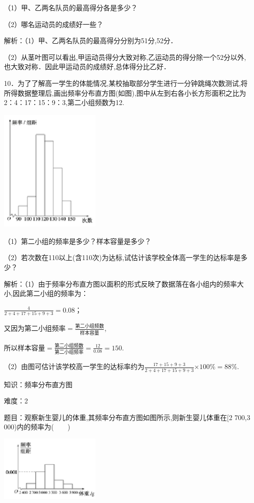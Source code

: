 \documentclass{article} %
\begin{document}
（1）甲、乙两名队员的最高得分各是多少？

（2）哪名运动员的成绩好一些？

解析：（1）甲、乙两名队员的最高得分分别为51分,52分．

（2）从茎叶图可以看出,甲运动员得分大致对称,乙运动员的得分除一个52分以外,也大致对称．因此甲运动员的成绩好,总体得分比乙好．

10．为了了解高一学生的体能情况,某校抽取部分学生进行一分钟跳绳次数测试,将所得数据整理后,画出频率分布直方图(如图),图中从左到右各小长方形面积之比为2：4：17：15：9：3,第二小组频数为12.

\includegraphics*[width=1.95in, height=2.40in, keepaspectratio=false]{image88}

（1）第二小组的频率是多少？样本容量是多少？

（2）若次数在110以上(含110次)为达标,试估计该学校全体高一学生的达标率是多少？

解析：（1）由于频率分布直方图以面积的形式反映了数据落在各小组内的频率大小,因此第二小组的频率为：

$\frac{4}{2+4+17+15+9+3}=0.08$；

又因为第二小组频率$=\frac{\text{第二小组频数}}{样本容量}$,

所以样本容量$=\frac{\text{第二小组频数}}{第二小组频率}=\frac{12}{0.08}=150$.

（2）由图可估计该学校高一学生的达标率约为$\frac{17+15+9+3}{2+4+17+15+9+3}\mathrm{\times}100\%=88\%$.

知识：频率分布直方图

难度：2

题目：观察新生婴儿的体重,其频率分布直方图如图所示,则新生婴儿体重在[2 700,3 000)内的频率为(　　)

\includegraphics*[width=1.95in, height=1.29in, keepaspectratio=false]{image89}
\end{document}

